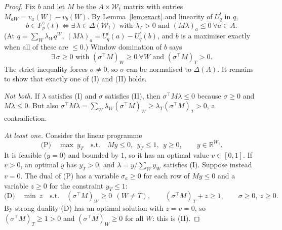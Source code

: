 \documentclass[11pt]{article}
\theoremstyle{definition}
\begin{document}
\begin{proof}
Fix $b$ and let $M$ be the $A \times \mathcal W_t$ matrix with entries
$M_{aW} = v_a(W) - v_b(W)$. By Lemma~\ref{lem:exact} and linearity of $U^t_q$ in $q$,
\[
b \in F^\gamma_p(t) \iff \exists\, \lambda \in \Delta(\mathcal W_t) \text{ with }
\lambda_T > 0 \text{ and } (M\lambda)_a \le 0 \ \forall a \in A. \tag{I}
\]
(At $q = \sum_W \lambda_W q^W$, $(M\lambda)_a = U^t_q(a) - U^t_q(b)$, and $b$ is a
maximiser exactly when all of these are $\le 0$.) Window domination of $b$ says
\[
\exists\, \sigma \ge 0 \text{ with } (\sigma^\top M)_W \ge 0\ \forall W
\text{ and } (\sigma^\top M)_T > 0. \tag{II}
\]
The strict inequality forces $\sigma \neq 0$, so $\sigma$ can be normalised to
$\Delta(A)$. It remains to show that exactly one of (I) and (II) holds.

\emph{Not both.} If $\lambda$ satisfies (I) and $\sigma$ satisfies (II), then
$\sigma^\top M \lambda \le 0$ because $\sigma \ge 0$ and $M\lambda \le 0$. But also
$\sigma^\top M \lambda = \sum_W \lambda_W (\sigma^\top M)_W \ge \lambda_T (\sigma^\top M)_T > 0$,
a contradiction.

\emph{At least one.} Consider the linear programme
\[
\text{(P)}\quad \max\ y_T \quad \text{s.t.}\quad M y \le 0,\ \ y_T \le 1,\ \ y \ge 0,
\qquad y \in \mathbb R^{\mathcal W_t}.
\]
It is feasible ($y = 0$) and bounded by $1$, so it has an optimal value $v \in [0,1]$.
If $v > 0$, an optimal $y$ has $y_T > 0$, and $\lambda = y / \sum_W y_W$ satisfies (I).
Suppose instead $v = 0$. The dual of (P) has a variable $\sigma_a \ge 0$ for each row
of $M y \le 0$ and a variable $z \ge 0$ for the constraint $y_T \le 1$:
\[
\text{(D)}\quad \min\ z \quad \text{s.t.}\quad (\sigma^\top M)_W \ge 0 \ \ (W \neq T),\qquad
(\sigma^\top M)_T + z \ge 1,\qquad \sigma \ge 0,\ z \ge 0.
\]
By strong duality (D) has an optimal solution with $z = v = 0$, so
$(\sigma^\top M)_T \ge 1 > 0$ and $(\sigma^\top M)_W \ge 0$ for all $W$: this is (II).
\end{proof}
\end{document}
